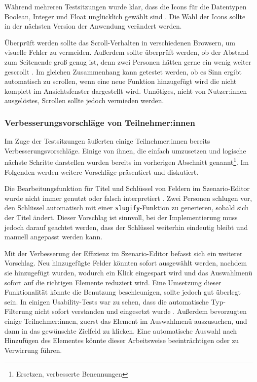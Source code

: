 Während mehreren Testsitzungen wurde klar, dass die Icons für die Datentypen Boolean, Integer und Float unglücklich gewählt sind . Die Wahl der Icons sollte in der nächsten Version der Anwendung verändert werden.

Überprüft werden sollte das Scroll-Verhalten in verschiedenen Browsern, um visuelle Fehler zu vermeiden. Außerdem sollte überprüft werden, ob der Abstand zum Seitenende groß genug ist, denn zwei Personen hätten gerne ein wenig weiter gescrollt . Im gleichen Zusammenhang kann getestet werden, ob es Sinn ergibt automatisch zu scrollen, wenn eine neue Funktion hinzugefügt wird die nicht komplett im Ansichtsfenster dargestellt wird. Unnötiges, nicht von Nutzer:innen ausgelöstes, Scrollen sollte jedoch vermieden werden.



\subsubsection{Verbesserungsvorschläge von Teilnehmer:innen}

Im Zuge der Testsitzungen äußerten einige Teilnehmer:innen bereits Verbesserungsvorschläge. Einige von ihnen, die einfach umzusetzen und logische nächste Schritte darstellen wurden bereits im vorherigen Abschnitt genannt\footnote{Ersetzen, verbesserte Benennungen}. Im Folgenden werden weitere Vorschläge präsentiert und diskutiert.

Die Bearbeitungsfunktion für Titel und Schlüssel von Feldern im Szenario-Editor wurde nicht immer genutzt oder falsch interpretiert . Zwei Personen schlugen vor, den Schlüssel automatisch mit einer \texttt{slugify}-Funktion zu generieren, sobald sich der Titel ändert. Dieser Vorschlag ist sinnvoll, bei der Implementierung muss jedoch darauf geachtet werden, dass der Schlüssel weiterhin eindeutig bleibt und manuell angepasst werden kann.

Mit der Verbesserung der Effizienz im Szenario-Editor befasst sich ein weiterer Vorschlag. Neu hinzugefügte Felder könnten sofort ausgewählt werden, nachdem sie hinzugefügt wurden, wodurch ein Klick eingespart wird und das Auswahlmenü sofort auf die richtigen Elemente reduziert wird. Eine Umsetzung dieser Funktionalität könnte die Benutzung beschleunigen, sollte jedoch gut überlegt sein. In einigen Usability-Tests war zu sehen, dass die automatische Typ-Filterung nicht sofort verstanden und eingesetzt wurde . Außerdem bevorzugten einige Teilnehmer:innen, zuerst das Element im Auswahlmenü auszusuchen, und dann in das gewünschte Zielfeld zu klicken. Eine automatische Auswahl nach Hinzufügen des Elementes könnte dieser Arbeitsweise beeinträchtigen oder zu Verwirrung führen.


